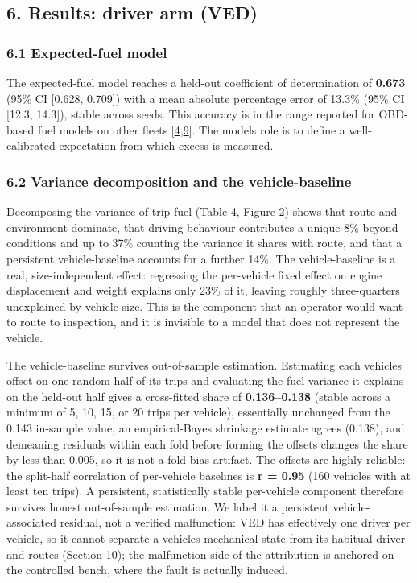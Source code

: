 \subsection{6. Results: driver arm (VED)}\label{arm1}

\subsubsection{6.1 Expected-fuel model}\label{expected-fuel-model}

The expected-fuel model reaches a held-out coefficient of determination
of \textbf{0.673} (95\% CI {[}0.628, 0.709{]}) with a mean absolute
percentage error of 13.3\% (95\% CI {[}12.3, 14.3{]}), stable across
seeds. This accuracy is in the range reported for OBD-based fuel models
on other fleets {[}\hyperref[r4]{4},\hyperref[r9]{9}{]}. The
model\textquotesingle s role is to define a well-calibrated expectation
from which excess is measured.

\subsubsection{6.2 Variance decomposition and the
vehicle-baseline}\label{variance-decomposition-and-the-vehicle-baseline}

Decomposing the variance of trip fuel (Table 4, Figure 2) shows that
route and environment dominate, that driving behaviour contributes a
unique 8\% beyond conditions and up to 37\% counting the variance it
shares with route, and that a persistent vehicle-baseline accounts for a
further 14\%. The vehicle-baseline is a real, size-independent effect:
regressing the per-vehicle fixed effect on engine displacement and
weight explains only 23\% of it, leaving roughly three-quarters
unexplained by vehicle size. This is the component that an operator
would want to route to inspection, and it is invisible to a model that
does not represent the vehicle.

The vehicle-baseline survives out-of-sample estimation. Estimating each
vehicle\textquotesingle s offset on one random half of its trips and
evaluating the fuel variance it explains on the held-out half gives a
cross-fitted share of \textbf{0.136--0.138} (stable across a minimum of
5, 10, 15, or 20 trips per vehicle), essentially unchanged from the
0.143 in-sample value, an empirical-Bayes shrinkage estimate agrees
(0.138), and demeaning residuals within each fold before forming the
offsets changes the share by less than 0.005, so it is not a fold-bias
artifact. The offsets are highly reliable: the split-half correlation of
per-vehicle baselines is \textbf{r = 0.95} (160 vehicles with at least
ten trips). A persistent, statistically stable per-vehicle component
therefore survives honest out-of-sample estimation. We label it a
persistent vehicle-associated residual, not a verified malfunction: VED
has effectively one driver per vehicle, so it cannot separate a
vehicle\textquotesingle s mechanical state from its habitual driver and
routes (Section 10); the malfunction side of the attribution is anchored
on the controlled bench, where the fault is actually induced.

